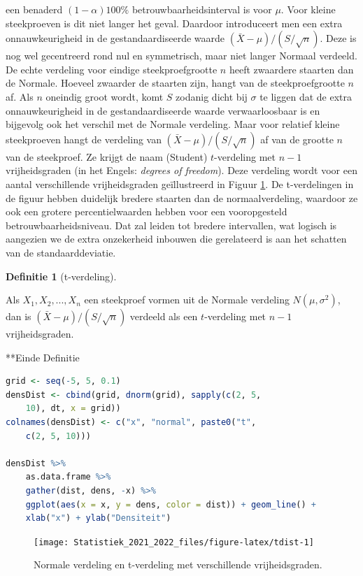 \documentclass[
  12pt,dutch,coursenotes]{book}
\theoremstyle{definition}
\newtheorem{definition}{Definitie}[chapter]
\theoremstyle{definition}
\theoremstyle{definition}
\theoremstyle{definition}
\theoremstyle{remark}
\begin{document}
een benaderd \((1- \alpha)100\%\) betrouwbaarheidsinterval is voor \(\mu\). Voor
kleine steekproeven is dit niet langer het geval. Daardoor introduceert men
een extra onnauwkeurigheid in de gestandaardiseerde waarde \({(\bar{X} - \mu)}/{(S/\sqrt{n})}\). Deze is nog wel gecentreerd rond nul en symmetrisch, maar niet langer Normaal verdeeld. De echte verdeling voor eindige
steekproefgrootte \(n\) heeft zwaardere staarten dan de Normale. Hoeveel
zwaarder de staarten zijn, hangt van de steekproefgrootte \(n\) af. Als \(n\)
oneindig groot wordt, komt \(S\) zodanig dicht bij \(\sigma\) te liggen dat de
extra onnauwkeurigheid in de gestandaardiseerde waarde verwaarloosbaar is en
bijgevolg ook het verschil met de Normale verdeling. Maar voor relatief
kleine steekproeven hangt de verdeling van \({(\bar{X} - \mu)}/({S/\sqrt{n}})\) af van de grootte \(n\) van de steekproef. Ze krijgt de naam (Student) \(t\)-verdeling met \(n-1\) vrijheidsgraden (in het Engels: \emph{degrees of freedom}). Deze verdeling wordt voor een aantal verschillende vrijheidsgraden geïllustreerd in Figuur \ref{fig:tdist}.
De t-verdelingen in de figuur hebben duidelijk bredere staarten dan de normaalverdeling, waardoor ze ook een grotere percentielwaarden hebben voor een vooropgesteld betrouwbaarheidsniveau.
Dat zal leiden tot bredere intervallen, wat logisch is aangezien we de extra onzekerheid inbouwen die gerelateerd is aan het schatten van de standaarddeviatie.

\begin{definition}[t-verdeling]
\protect\hypertarget{def:unnamed-chunk-150}{}{\label{def:unnamed-chunk-150} {} }
\end{definition}
Als \(X_1, X_2, ..., X_n\) een steekproef vormen uit de Normale verdeling \(N(\mu, \sigma^2)\), dan is \((\bar{X} - \mu)/(S/\sqrt{n})\) verdeeld als een \(t\)-verdeling met \(n-1\) vrijheidsgraden.

**Einde Definitie

\begin{lstlisting}[language=R]
grid <- seq(-5, 5, 0.1)
densDist <- cbind(grid, dnorm(grid), sapply(c(2, 5,
    10), dt, x = grid))
colnames(densDist) <- c("x", "normal", paste0("t",
    c(2, 5, 10)))

densDist %>%
    as.data.frame %>%
    gather(dist, dens, -x) %>%
    ggplot(aes(x = x, y = dens, color = dist)) + geom_line() +
    xlab("x") + ylab("Densiteit")
\end{lstlisting}

\begin{figure}

{\centering \texttt{[image: Statistiek\_2021\_2022\_files/figure-latex/tdist-1]} 

}

\caption{Normale verdeling en t-verdeling met verschillende vrijheidsgraden.}\label{fig:tdist}
\end{figure}
\end{document}
